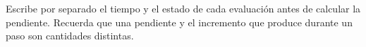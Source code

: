Escribe por separado el tiempo y el estado de cada evaluación antes de calcular la pendiente. Recuerda que una pendiente y el incremento que produce durante un paso son cantidades distintas.
